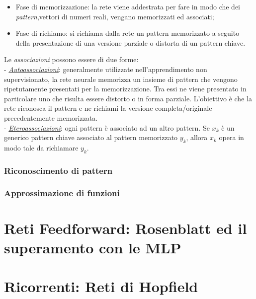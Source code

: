 \documentclass[12pt,a4paper,oneside]{book}
\begin{document}
		\begin{itemize}
		 \item Fase di memorizzazione: la rete viene addestrata per fare in modo che dei \emph{pattern},vettori di numeri reali, vengano memorizzati ed associati;
		 \item Fase di richiamo: si richiama dalla rete un pattern memorizzato a seguito della presentazione di una versione parziale o distorta di un pattern chiave. 
		\end{itemize}
	
		Le \emph{associazioni} possono essere di due forme:\\ 
		- \underline{\emph{Autoassociazioni}}: generalmente utilizzate nell'apprendimento non supervisionato, la rete neurale memorizza un insieme di pattern che vengono ripetutamente presentati per la memorizzazione. Tra essi ne viene presentato in particolare uno che risulta essere distorto o in forma parziale. L'obiettivo è che la rete riconosca il pattern e ne richiami la versione completa/originale precedentemente memorizzata.\\
		-  \underline{\emph{Eteroassociazioni}}: ogni pattern è associato ad un altro pattern. Se $x_{k}$ è un generico pattern chiave associato al pattern memorizzato $y_{k}$, allora $x_{k}$ opera in modo tale da richiamare $y_{k}$.
		\clearpage
		
		\subsection{Riconoscimento di pattern}
		
		\subsection{Approssimazione di funzioni}
		
		
		
		
    
    
    
   
   

    	 
	
	
	\chapter{Reti Feedforward: Rosenblatt ed il superamento con le MLP}
	
	\chapter{Ricorrenti: Reti di Hopfield}
\end{document}
